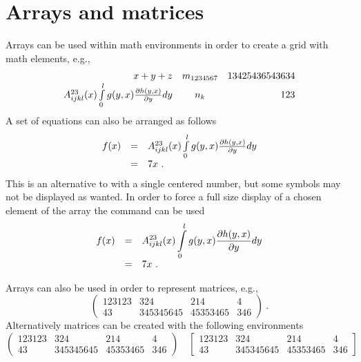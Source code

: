 \section{Arrays and matrices}

Arrays can be used within math environments in order to create a grid with math elements, e.g.,
\begin{equation}
	\begin{array}{rcr}
	x + y + z 
		& m_{1234567} 
		& 13425436543634 \\
	A^{23}_{ijkl}(x) \int_0^l\limits g(y,x) \frac{\partial h(y,x)}{\partial y} d y 
		& n_{k} 
		& 123
	\end{array}
\end{equation}
A set of equations can also be arranged as follows
\begin{equation}
	\begin{array}{rcl}
	f(x)
	&=& A^{23}_{ijkl}(x) \int_0^l\limits g(y,x) \frac{\partial h(y,x)}{\partial y} d y \\
	&=& 7 x \ .
	\end{array}
\end{equation}
This is an alternative to  with a single centered number, but some symbols may not be displayed as wanted. In order to force a full size display of a chosen element of the array the command  can be used
\begin{equation}
	\begin{array}{rcl}
	f(x)
	&=& \displaystyle A^{23}_{ijkl}(x) \int_0^l\limits g(y,x) \frac{\partial h(y,x)}{\partial y} d y \\
	&=& 7 x \ .
	\end{array}
\end{equation} 

Arrays can also be used in order to represent matrices, e.g., 
\begin{equation}
	\left(
	\begin{array}{cccc}
	123123 & 324 & 214 & 4 \\
	43& 345345645 & 45353465 & 346
	\end{array}
	\right) \ .
\end{equation}
Alternatively matrices can be created with the following environments
\begin{equation}
	\begin{pmatrix}
	123123 & 324 & 214 & 4 \\
	43& 345345645 & 45353465 & 346
	\end{pmatrix} 
	\quad
	\begin{bmatrix}
	123123 & 324 & 214 & 4 \\
	43& 345345645 & 45353465 & 346
	\end{bmatrix}
\end{equation}

